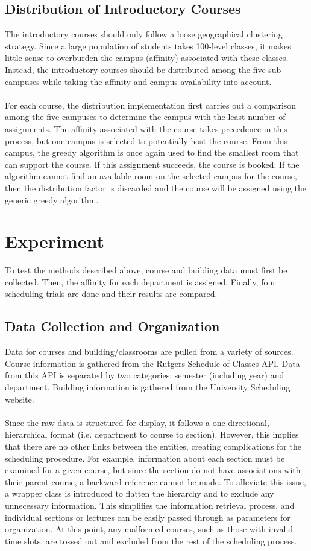 \documentclass[12pt]{article}
\begin{document}
\subsection{Distribution of Introductory Courses}
The introductory courses should only follow a loose geographical clustering strategy. Since a large population of students takes 100-level classes, it makes little sense to overburden the campus (affinity) associated with these classes. Instead, the introductory courses should be distributed among the five sub-campuses while taking the affinity and campus availability into account.
\\\\
For each course, the distribution implementation first carries out a comparison among the five campuses to determine the campus with the least number of assignments. The affinity associated with the course takes precedence in this process, but one campus is selected to potentially host the course. From this campus, the greedy algorithm is once again used to find the smallest room that can support the course. If this assignment succeeds, the course is booked. If the algorithm cannot find an available room on the selected campus for the course, then the distribution factor is discarded and the course will be assigned using the generic greedy algorithm.

\section{Experiment}
To test the methods described above, course and building data must first be collected. Then, the affinity for each department is assigned. Finally, four scheduling trials are done and their results are compared.

\subsection{Data Collection and Organization}
Data for courses and building/classrooms are pulled from a variety of sources. Course information is gathered from the Rutgers Schedule of Classes API. Data from this API is separated by two categories: semester (including year) and department. Building information is gathered from the University Scheduling website.
\\\\
Since the raw data is structured for display, it follows a one directional, hierarchical format (i.e. department to course to section). However, this implies that there are no other links between the entities, creating complications for the scheduling procedure. For example, information about each section must be examined for a given course, but since the section do not have associations with their parent course, a backward reference cannot be made. To alleviate this issue, a wrapper class is introduced to flatten the hierarchy and to exclude any unnecessary information. This simplifies the information retrieval process, and individual sections or lectures can be easily passed through as parameters for organization. At this point, any malformed courses, such as those with invalid time slots, are tossed out and excluded from the rest of the scheduling process. 
\end{document}
